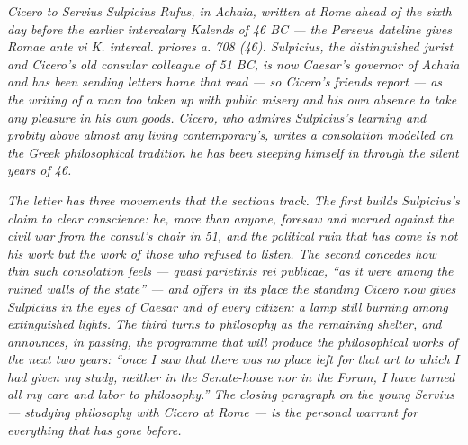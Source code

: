 
\textit{Cicero to Servius Sulpicius Rufus, in Achaia, written at
Rome ahead of the sixth day before the earlier intercalary
Kalends of 46 BC --- the Perseus dateline gives \textit{Romae
ante vi K. intercal. priores a. 708 (46)}. Sulpicius, the
distinguished jurist and Cicero's old consular colleague of 51
BC, is now Caesar's governor of Achaia and has been sending
letters home that read --- so Cicero's friends report --- as
the writing of a man too taken up with public misery and his
own absence to take any pleasure in his own goods. Cicero, who
admires Sulpicius's learning and probity above almost any
living contemporary's, writes a consolation modelled on the
Greek philosophical tradition he has been steeping himself in
through the silent years of 46.}

\textit{The letter has three movements that the sections track.
The first builds Sulpicius's claim to clear conscience: he, more
than anyone, foresaw and warned against the civil war from the
consul's chair in 51, and the political ruin that has come is
not his work but the work of those who refused to listen. The
second concedes how thin such consolation feels --- \textit{quasi
parietinis rei publicae}, ``as it were among the ruined walls of
the state'' --- and offers in its place the standing Cicero now
gives Sulpicius in the eyes of Caesar and of every citizen: a
lamp still burning among extinguished lights. The third turns to
philosophy as the remaining shelter, and announces, in passing,
the programme that will produce the philosophical works of the
next two years: ``once I saw that there was no place left for
that art to which I had given my study, neither in the
Senate-house nor in the Forum, I have turned all my care and
labor to philosophy.'' The closing paragraph on the young
Servius --- studying philosophy with Cicero at Rome --- is the
personal warrant for everything that has gone before.}
